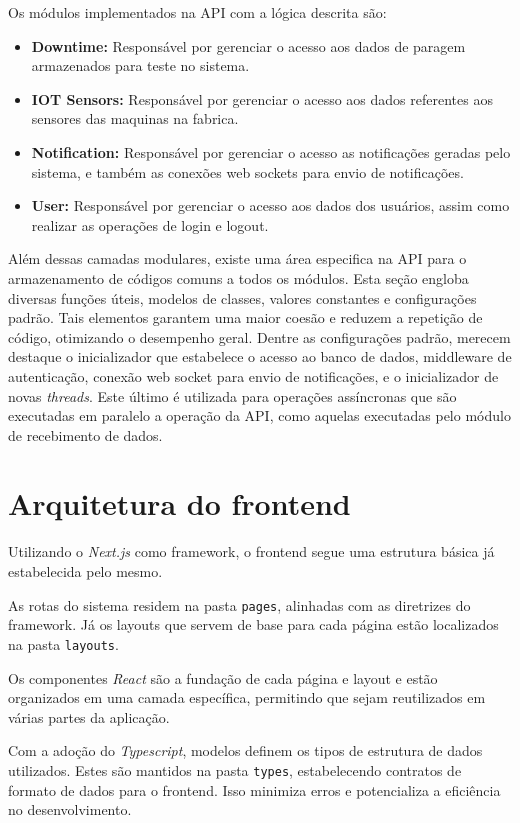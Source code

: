 Os módulos implementados na \gls{API} com a lógica descrita são:
\begin{itemize}
	\item \textbf{Downtime:} Responsável por gerenciar o acesso aos dados de paragem armazenados para teste no sistema.
	\item \textbf{IOT Sensors:} Responsável por gerenciar o acesso aos dados referentes aos sensores das maquinas na fabrica.
	\item \textbf{Notification:} Responsável por gerenciar o acesso as notificações geradas pelo sistema, e também as conexões web sockets para envio de notificações.
	\item \textbf{User:} Responsável por gerenciar o acesso aos dados dos usuários, assim como realizar as operações de login e logout. 
\end{itemize}

Além dessas camadas modulares, existe uma área especifica na \gls{API} para o armazenamento de códigos comuns a todos os módulos. Esta seção engloba diversas funções úteis, modelos de classes, valores constantes e configurações padrão. Tais elementos garantem uma maior coesão e reduzem a repetição de código, otimizando o desempenho geral. Dentre as configurações padrão, merecem destaque o inicializador que estabelece o acesso ao banco de dados, middleware de autenticação, conexão web socket para envio de notificações, e o inicializador de novas \textit{threads}. Este último é utilizada para operações assíncronas que são executadas em paralelo a operação da \gls{API}, como aquelas executadas pelo módulo de recebimento de dados.

\section[Arquitetura do frontend]{Arquitetura do frontend}
Utilizando o \textit{Next.js} como framework, o frontend segue uma estrutura básica já estabelecida pelo mesmo.

As rotas do sistema residem na pasta \texttt{pages}, alinhadas com as diretrizes do framework. Já os layouts que servem de base para cada página estão localizados na pasta \texttt{layouts}.

Os componentes \textit{React} são a fundação de cada página e layout e estão organizados em uma camada específica, permitindo que sejam reutilizados em várias partes da aplicação.

Com a adoção do \textit{Typescript}, modelos definem os tipos de estrutura de dados utilizados. Estes são mantidos na pasta \texttt{types}, estabelecendo contratos de formato de dados para o frontend. Isso minimiza erros e potencializa a eficiência no desenvolvimento.

